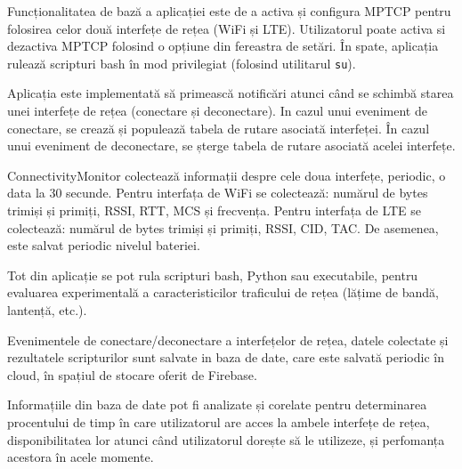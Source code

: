 Funcționalitatea de bază a aplicației este de a activa și configura MPTCP pentru folosirea celor două interfețe de rețea (WiFi și LTE). Utilizatorul poate activa si dezactiva MPTCP folosind o opțiune din fereastra de setări. În spate, aplicația rulează scripturi bash în mod privilegiat (folosind utilitarul \texttt{su}).

Aplicația este implementată să primească notificări atunci când se schimbă starea unei interfețe de rețea (conectare și deconectare). In cazul unui eveniment de conectare, se crează și populează tabela de rutare asociată interfeței. În cazul unui eveniment de deconectare, se șterge tabela de rutare asociată acelei interfețe.

ConnectivityMonitor colectează informații despre cele doua interfețe, periodic, o data la 30 secunde. Pentru interfața de WiFi se colectează: numărul de bytes trimiși și primiți, RSSI, RTT, MCS și frecvența. Pentru interfața de LTE se colectează: numărul de bytes trimiși și primiți, RSSI, CID, TAC. De asemenea, este salvat periodic nivelul bateriei. 

Tot din aplicație se pot rula scripturi bash, Python sau executabile, pentru evaluarea experimentală a caracteristicilor traficului de rețea (lățime de bandă, lantență, etc.).

Evenimentele de conectare/deconectare a interfețelor de rețea, datele colectate și rezultatele scripturilor sunt salvate in baza de date, care este salvată periodic în cloud, în spațiul de stocare oferit de Firebase. 

Informațiile din baza de date pot fi analizate și corelate pentru determinarea procentului de timp în care utilizatorul are acces la ambele interfețe de rețea, disponibilitatea lor atunci când utilizatorul dorește să le utilizeze, și perfomanța acestora în  acele momente.


